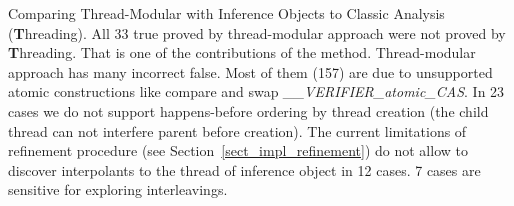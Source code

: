 Comparing Thread-Modular with Inference Objects to Classic Analysis ({\textbf Threading}). All 33 true proved by thread-modular approach were not proved by {\textbf Threading}. That is one of the contributions of the method.
Thread-modular approach has many incorrect false.
Most of them (157) are due to unsupported atomic constructions like compare and swap {\em \_\_VERIFIER\_atomic\_CAS}. In 23 cases we do not support happens-before ordering by thread creation (the child thread can not interfere parent before creation). The current limitations of refinement procedure (see Section~\ref{sect_impl_refinement}) do not allow to discover interpolants to the thread of inference object in 12 cases. 7 cases are sensitive for exploring interleavings.

%
%
%
%
